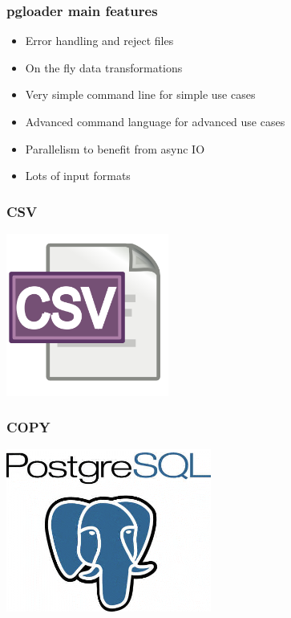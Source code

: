 \documentclass{beamer}
\begin{document}
\begin{frame}[fragile]
  \frametitle{pgloader main features}

  \vfill
  
  \begin{itemize}
  \item Error handling and reject files
  \item On the fly data transformations
  \item Very simple command line for simple use cases
  \item Advanced command language for advanced use cases
  \item Parallelism to benefit from async IO
  \item Lots of input formats
  \end{itemize}  
\end{frame}

\begin{frame}
  \frametitle{CSV}


  \begin{center}
    \includegraphics[height=2.1in]{csv_text.png}
  \end{center}
\end{frame}

\begin{frame}
  \frametitle{COPY}


  \begin{center}
    \includegraphics[height=2.1in]{postgres-logo.png}
  \end{center}
\end{frame}
\end{document}
